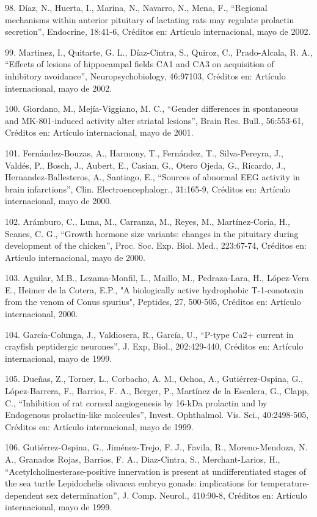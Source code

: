 98. Díaz, N., Huerta, I., Marina, N., Navarro, N., Mena, F., “Regional mechanisms within anterior pituitary of lactating rats 
may regulate prolactin secretion”, Endocrine, 18:41-6, Créditos en: Artículo internacional, mayo de 2002.

99. Martinez, I., Quitarte, G. L., Díaz-Cintra, S., Quiroz, C., Prado-Alcala, R. A., “Effects of lesions of hippocampal fields 
CA1 and CA3 on acquisition of inhibitory avoidance”, Neuropsychobiology, 46:97103, Créditos en: Artículo internacional, mayo de 
2002.

100. Giordano, M., Mejía-Viggiano, M. C., “Gender differences in spontaneous and MK-801-induced activity alter striatal 
lesions”, Brain Res. Bull., 56:553-61, Créditos en: Artículo internacional, mayo de 2001.

101. Fernández-Bouzas, A., Harmony, T., Fernández, T., Silva-Pereyra, J., Valdés, P., Bosch, J., Aubert, E., Casian, G., Otero 
Ojeda, G., Ricardo, J., Hernandez-Ballesteros, A., Santiago, E., “Sources of abnormal EEG activity in brain infarctions”, Clin. 
Electroencephalogr., 31:165-9, Créditos en: Artículo internacional, mayo de 2000.

102. Arámburo, C., Luna, M., Carranza, M., Reyes, M., Martínez-Coria, H., Scanes, C. G., “Growth hormone size variants: changes 
in the pituitary during development of the chicken”, Proc. Soc. Exp. Biol. Med., 223:67-74, Créditos en: Artículo 
internacional, mayo de 2000.

103. Aguilar, M.B., Lezama-Monfil, L., Maillo, M., Pedraza-Lara, H., López-Vera E., Heimer de la Cotera, E.P., "A biologically 
active hydrophobic T-1-conotoxin from the venom of Conus spurius", Peptides, 27, 500-505, Créditos en: Artículo internacional, 
2000.

104. García-Colunga, J., Valdiosera, R., García, U., “P-type Ca2+ current in crayfish peptidergic neurones”, J. Exp, Biol., 
202:429-440, Créditos en: Artículo internacional, mayo de 1999.

105. Dueñas, Z., Torner, L., Corbacho, A. M., Ochoa, A., Gutiérrez-Ospina, G., López-Barrera, F., Barrios, F. A., Berger, P., 
Martínez de la Escalera, G., Clapp, C., “Inhibition of rat corneal angiogenesis by 16-kDa prolactin and by Endogenous 
prolactin-like molecules”, Invest. Ophthalmol. Vis. Sci., 40:2498-505, Créditos en: Artículo internacional, mayo de 1999.

106. Gutiérrez-Ospina, G., Jiménez-Trejo, F. J., Favila, R., Moreno-Mendoza, N. A., Granados Rojas, Barrios, F. A., 
Diaz-Cintra, S., Merchant-Larios, H., “Acetylcholinesterase-positive innervation is present at undifferentiated stages of the 
sea turtle Lepidochelis olivacea embryo gonads: implications for temperature-dependent sex determination”, J. Comp. Neurol., 
410:90-8, Créditos en: Artículo internacional, mayo de 1999.

